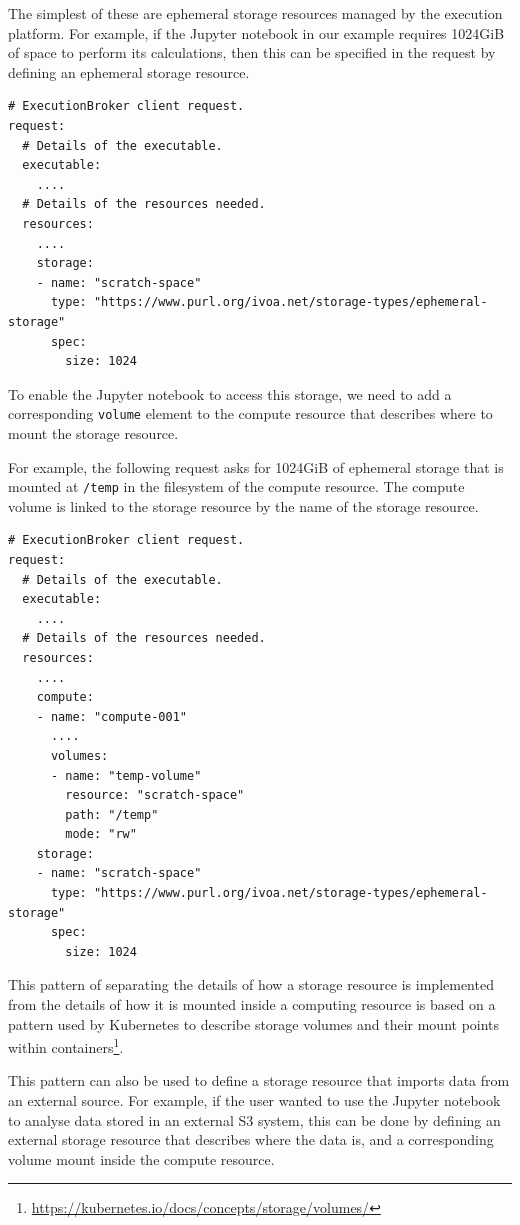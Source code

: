 \documentclass[11pt,a4paper]{ivoa}
\newcommand{\jupyternotebook} {Jupyter notebook}
\newcommand{\kubernetes} {Kubernetes}
\newcommand{\codeword}[1] {\texttt{#1}}
\newcommand{\footurl}[1] {\footnote{\url{#1}}}
\begin{document}
The simplest of these are ephemeral storage resources managed by the execution platform.
For example, if the \jupyternotebook{} in our example requires 1024GiB of space to perform its calculations,
then this can be specified in the request by defining an ephemeral storage resource.

\begin{lstlisting}[]
# ExecutionBroker client request.
request:
  # Details of the executable.
  executable:
    ....
  # Details of the resources needed.
  resources:
    ....
    storage:
    - name: "scratch-space"
      type: "https://www.purl.org/ivoa.net/storage-types/ephemeral-storage"
      spec:
        size: 1024
\end{lstlisting}

To enable the \jupyternotebook{} to access this storage, we need to add a
corresponding \codeword{volume} element to the compute resource that describes
where to mount the storage resource.

For example, the following request asks for 1024GiB of ephemeral storage
that is mounted at \codeword{/temp} in the filesystem of the compute resource.
The compute volume is linked to the storage resource by the name of the
storage resource.

\begin{lstlisting}[]
# ExecutionBroker client request.
request:
  # Details of the executable.
  executable:
    ....
  # Details of the resources needed.
  resources:
    ....
    compute:
    - name: "compute-001"
      ....
      volumes:
      - name: "temp-volume"
        resource: "scratch-space"
        path: "/temp"
        mode: "rw"
    storage:
    - name: "scratch-space"
      type: "https://www.purl.org/ivoa.net/storage-types/ephemeral-storage"
      spec:
        size: 1024
\end{lstlisting}

This pattern of separating the details of how a storage resource is implemented
from the details of how it is mounted inside a computing resource is based on a
pattern used by \kubernetes{} to describe storage volumes and their mount points
within containers\footurl{https://kubernetes.io/docs/concepts/storage/volumes/}.

This pattern can also be used to define a storage resource that imports data from
an external source.
For example, if the user wanted to use the \jupyternotebook{} to analyse data stored
in an external S3 system, this can be done by defining an external storage resource
that describes where the data is,
and a corresponding volume mount inside the compute resource.
\end{document}
